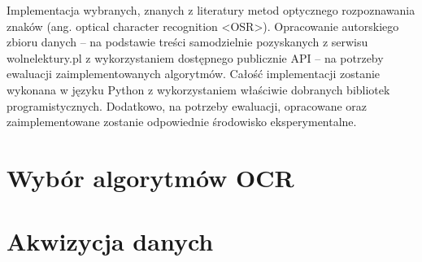 \label{chapter:rozdzialtrzeci}

Implementacja wybranych, znanych z literatury metod optycznego rozpoznawania znaków (ang. optical character recognition <OSR>). Opracowanie autorskiego zbioru danych – na podstawie treści samodzielnie pozyskanych z serwisu wolnelektury.pl z wykorzystaniem dostępnego publicznie API – na potrzeby ewaluacji zaimplementowanych algorytmów. 
Całość implementacji zostanie wykonana w języku Python z wykorzystaniem właściwie dobranych bibliotek programistycznych. Dodatkowo, na potrzeby ewaluacji, opracowane oraz zaimplementowane zostanie odpowiednie środowisko eksperymentalne.

\section{Wybór algorytmów OCR}


\section{Akwizycja danych}

